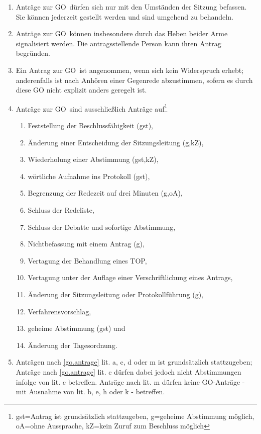 \documentclass[a4paper, 12pt, ngerman]{article}
\newcommand{\go}{GO}
\begin{document}
\begin{enumerate}[leftmargin=0cm]
	\begin{enumerate}[leftmargin=0cm]
		\item Anträge zur \go~dürfen sich nur mit den Umständen der Sitzung befassen. Sie können jederzeit gestellt werden und sind umgehend zu behandeln.
		\item Anträge zur \go~können insbesondere durch das Heben beider Arme signalisiert werden. Die antragsstellende Person kann ihren Antrag begründen.
		\item Ein Antrag zur \go~ist angenommen, wenn sich kein
		Widerspruch erhebt; anderenfalls ist nach Anhören einer
		Gegenrede abzustimmen, sofern es durch diese GO nicht explizit anders geregelt ist. 
		\item Anträge zur \go~sind ausschließlich Anträge auf\footnote{gst=Antrag ist grundsätzlich stattzugeben, g=geheime Abstimmung möglich, oA=ohne Aussprache, kZ=kein Zuruf zum Beschluss möglich}
		\begin{enumerate}[leftmargin=0.5cm]\label{go.antrage}
			\item Feststellung der Beschlussfähigkeit (gst),
			\item Änderung einer Entscheidung der Sitzungsleitung (g,kZ),
			\item Wiederholung einer Abstimmung (gst,kZ),
			\item wörtliche Aufnahme ins Protokoll (gst),
			\item Begrenzung der Redezeit auf drei Minuten (g,oA),
			\item Schluss der Redeliste,
			\item Schluss der Debatte und sofortige Abstimmung,
			\item Nichtbefassung mit einem Antrag (g),	
			\item Vertagung der Behandlung eines TOP,
			\item Vertagung unter der Auflage einer Verschriftlichung eines Antrags,
			\item Änderung der Sitzungsleitung oder Protokollführung (g),
			\item Verfahrensvorschlag,
			\item geheime Abstimmung (gst) und
			\item Änderung der Tagesordnung. 
		\end{enumerate}
		\item Anträgen nach \cref{go.antrage} lit. a, c, d oder m ist grundsätzlich stattzugeben; Anträge nach \cref{go.antrage} lit. c dürfen dabei jedoch nicht Abstimmungen infolge von lit. c betreffen. Anträge nach lit. m dürfen keine GO-Anträge - mit Ausnahme von lit. b, e, h oder k - betreffen.\label{go.ratsantrag}

\end{enumerate}
\end{enumerate}
\end{document}
